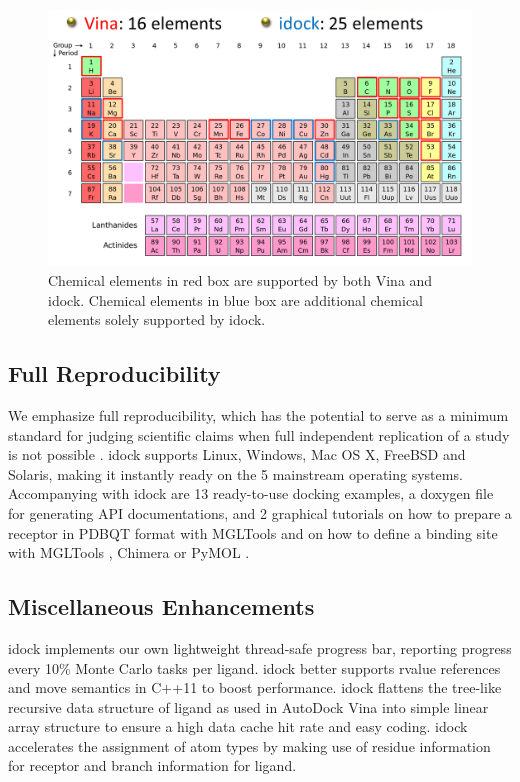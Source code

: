 \begin{figure}
\centering
\includegraphics[width=\linewidth]{idock/ChemicalElements.png}
\caption{Chemical elements in red box are supported by both Vina and idock. Chemical elements in blue box are additional chemical elements solely supported by idock.}
\label{idock:ChemicalElements}
\end{figure}

\subsection{Full Reproducibility}

We emphasize full reproducibility, which has the potential to serve as a minimum standard for judging scientific claims when full independent replication of a study is not possible \citep{965}. idock supports Linux, Windows, Mac OS X, FreeBSD and Solaris, making it instantly ready on the 5 mainstream operating systems. Accompanying with idock are 13 ready-to-use docking examples, a doxygen file for generating API documentations, and 2 graphical tutorials on how to prepare a receptor in PDBQT format with MGLTools \citep{596} and on how to define a binding site with MGLTools \citep{596}, Chimera \citep{1219} or PyMOL \citep{1221}.

\subsection{Miscellaneous Enhancements}

idock implements our own lightweight thread-safe progress bar, reporting progress every 10\% Monte Carlo tasks per ligand. idock better supports rvalue references and move semantics in C++11 to boost performance. idock flattens the tree-like recursive data structure of ligand as used in AutoDock Vina into simple linear array structure to ensure a high data cache hit rate and easy coding. idock accelerates the assignment of atom types by making use of residue information for receptor and branch information for ligand.

